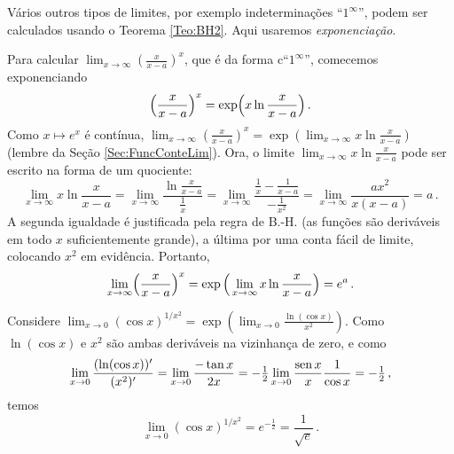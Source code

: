 Vários outros tipos de limites, por exemplo indeterminações
``$1^\infty$'', podem ser calculados usando o Teorema
\ref{Teo:BH2}. Aqui usaremos \emph{exponenciação}.
\begin{ex}
Para calcular $\lim_{x\to \infty}(\frac{x}{x-a})^x$, que é da forma 
c``$1^\infty$'', comecemos exponenciando
$$\Bigl(\frac{x}{x-a}\Bigr)^x=\exp\Bigl(x\ln \frac{x}{x-a}\Bigr)\,.$$ 
Como
$x\mapsto e^x$ é contínua, $\lim_{x\to \infty}(\frac{x}{x-a})^x=\exp(
\lim_{x\to \infty}x\ln \frac{x}{x-a})$ (lembre da Seção \ref{Sec:FuncConteLim}).
Ora, o limite $\lim_{x\to \infty}x\ln \frac{x}{x-a}$ pode ser escrito na forma
de um quociente:
$$
\lim_{x\to \infty}x\ln\frac{x}{x-a}=\lim_{x\to
\infty}\frac{\ln\frac{x}{x-a}}{\frac{1}{x}}
=\lim_{x\to\infty}\frac{\frac{1}{x}-\frac{1}{x-a}}{-\frac{1}{x^2}}=
\lim_{x\to \infty}\frac{ax^2}{x(x-a)}=a\,.
$$
A segunda igualdade é justificada pela regra de B.-H. (as funções
são {deriváveis} em todo $x$ suficientemente grande), 
a última por uma conta fácil de limite, colocando $x^2$ em evidência.
Portanto, 
$$
\lim_{x\to \infty}\Bigl(\frac{x}{x-a}\Bigr)^x=\exp\Big(
\lim_{x\to \infty}x\ln \frac{x}{x-a}\Big)=e^a\,.
$$
\end{ex}

\begin{ex} Considere $\lim_{x\to 0}(\cos x)^{1/x^2}=\exp(\lim_{x\to
0}\frac{\ln(\cos x)}{x^2})$.
Como $\ln(\cos x)$ e $x^2$ são ambas deriváveis na vizinhança de zero, e como
$$
\lim_{x\to 0}\frac{(\ln(\cos x))'}{(x^2)'}=
\lim_{x\to 0}\frac{-\tan x}{2x}=
-\tfrac12\lim_{x\to 0}\frac{\operatorname{sen} x}{x}\frac{1}{\cos x}=-\tfrac12\,,
$$
temos 
$$\lim_{x\to 0}(\cos x)^{1/x^2}
=e^{-\tfrac12}=\frac{1}{\sqrt{e}}\,.
$$
\end{ex}

